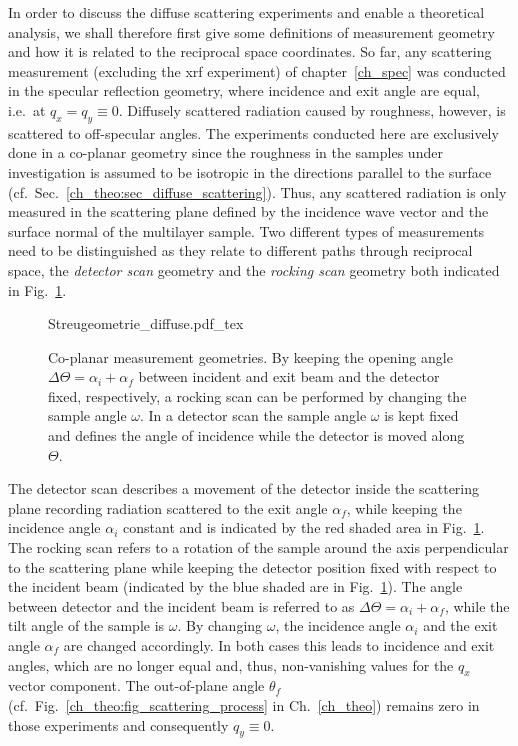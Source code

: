 In order to discuss the diffuse scattering experiments and enable a theoretical analysis, we shall therefore first give some definitions of measurement geometry and how it is related to the reciprocal space coordinates. So far, any scattering measurement (excluding the \gls{xrf} experiment) of chapter~\ref{ch_spec} was conducted in the specular reflection geometry, where incidence and exit angle are equal, i.e.~at $q_x = q_y \equiv 0$. Diffusely scattered radiation caused by roughness, however, is scattered to off-specular angles. The experiments conducted here are exclusively done in a co-planar geometry since the roughness in the samples under investigation is assumed to be isotropic in the directions parallel to the surface (cf.~Sec.~\ref{ch_theo:sec_diffuse_scattering}). Thus, any scattered radiation is only measured in the scattering plane defined by the incidence wave vector and the surface normal of the multilayer sample. Two different types of measurements need to be distinguished as they relate to different paths through reciprocal space, the \emph{detector scan} geometry and the \emph{rocking scan} geometry both indicated in Fig.~\ref{ch_diff:fig_scattering_geometry}.
\begin{figure}[htbp]
    \def\svgwidth{0.6\textwidth}
    {Streugeometrie_diffuse.pdf_tex}
    \caption{Co-planar measurement geometries. By keeping the opening angle $\Delta\Theta = \alpha_i + \alpha_f$ between incident and exit beam and the detector fixed, respectively, a rocking scan can be performed by changing the sample angle $\omega$. In a detector scan the sample angle $\omega$ is kept fixed and defines the angle of incidence while the detector is moved along $\Theta$.}
    \label{ch_diff:fig_scattering_geometry}
\end{figure}
The detector scan describes a movement of the detector inside the scattering plane recording radiation scattered to the exit angle $\alpha_f$, while keeping the incidence angle $\alpha_i$ constant and is indicated by the red shaded area in Fig.~\ref{ch_diff:fig_scattering_geometry}. The rocking scan refers to a rotation of the sample around the axis perpendicular to the scattering plane while keeping the detector position fixed with respect to the incident beam (indicated by the blue shaded are in Fig.~\ref{ch_diff:fig_scattering_geometry}). The angle between detector and the incident beam is referred to as $\Delta \Theta = \alpha_i + \alpha_f$, while the tilt angle of the sample is $\omega$. By changing $\omega$, the incidence angle $\alpha_i$ and the exit angle $\alpha_f$ are changed accordingly. In both cases this leads to incidence and exit angles, which are no longer equal and, thus, non-vanishing values for the $q_x$ vector component. The out-of-plane angle $\theta_f$ (cf.~Fig.~\ref{ch_theo:fig_scattering_process} in Ch.~\ref{ch_theo}) remains zero in those experiments and consequently $q_y \equiv 0$.

